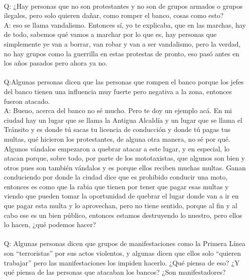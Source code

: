 \documentclass{phyasgn}\usepackage{nag}
\begin{document}
\\
Q: ¿Hay personas que no son protestantes y no son de grupos armados o grupos ilegales, pero solo quieren dañar, como romper el banco, cosas como esto?\\
A: eso se llama vandalismo. Entonces sí, yo te explicaba, que en las marchas, hay de todo, sabemos qué vamos a marchar por lo que es, hay personas que simplemente ye van a borrar, van robar y van a ser vandalismo, pero la verdad, no hay grupos como la guerrilla en estas protestas de pronto, eso pasó antes en los años pasados pero ahora ya no.\\
\\
Q:Algunas personas dicen que las personas que rompen el banco porque los jefes del banco tienen una influencia muy fuerte pero negativa a la zona, entonces fueron atacado.\\
A: Bueno, acerca del banco no sé mucho. Pero te doy un ejemplo acá. En mi ciudad hay un lugar que se llama la Antigua Alcaldía y un lugar que se llama el Tránsito y es donde tú sacas tu licencia de conducción y donde tú pagas tus multas, qué hicieron los protestantes, de alguna otra manera, no sé por qué. Algunos vándalos empezaron a quebrar atacar a este lugar, y en especial, lo atacan porque, sobre todo, por parte de los mototaxistas, que algunos son bien y otros pues son también vándalos y es porque ellos reciben muchas multas. Ganan conduciendo por donde la ciudad dice que es prohibido conducir una moto, entonces es como que la rabia que tienen por tener que pagar esas multas y viendo que pueden tomar la oportunidad de quebrar el lugar donde van a ir en que pagar esta multa y lo aprovechan, pero no tiene sentido, porque al fin y al cabo ese es un bien público, entonces estamos destruyendo lo nuestro, pero ellos lo hacen, ¿qué podemos hacer?\\
\\
Q: Algunas personas dicen que grupos de manifestaciones como la Primera Línea son “terroristas” por sus actos violentos, y algunas dicen que ellos solo “quieren trabajar” pero las manifestaciones los impiden hacerlo. ¿Qué piensa de eso? ¿Y qué piensa de las personas que atacaban los bancos? ¿Son manifestadores?\\
\end{document}
